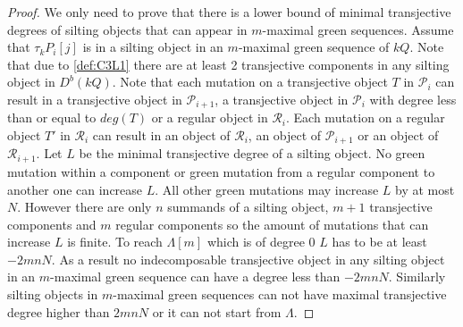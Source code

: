 \begin{proof}
\indent We only need to prove that there is a lower bound of minimal transjective degrees of silting objects that can appear in $m$-maximal green sequences. Assume that $\tau_kP_i[j]$ is in a silting object in an $m$-maximal green sequence of $kQ$. Note that due to \ref{def:C3L1} there are at least 2 transjective components in any silting object in $D^b(kQ)$. Note that each mutation on a transjective object $T$ in $\mathcal{P}_i$ can result in a transjective object in $\mathcal{P}_{i+1}$, a transjective object in $\mathcal{P}_i$ with degree less than or equal to $deg(T)$ or a regular object in $\mathcal{R}_i$. Each mutation on a regular object $T'$ in $\mathcal{R}_i$ can result in an object of $\mathcal{R}_i$, an object of $\mathcal{P}_{i+1}$ or an object of $\mathcal{R}_{i+1}$. Let $L$ be the minimal transjective degree of a silting object. No green mutation within a component or green mutation from a regular component to another one can increase $L$. All other green mutations may increase $L$ by at most $N$. However there are only $n$ summands of a silting object, $m+1$ transjective components and $m$ regular components so the amount of mutations that can increase $L$ is finite. To reach $\Lambda[m]$ which is of degree 0 $L$ has to be at least $-2mnN$. As a result no indecomposable transjective object in any silting object in an $m$-maximal green sequence can have a degree less than $-2mnN$. Similarly silting objects in $m$-maximal green sequences can not have maximal transjective degree higher than $2mnN$ or it can not start from $\Lambda$.
\end{proof}
